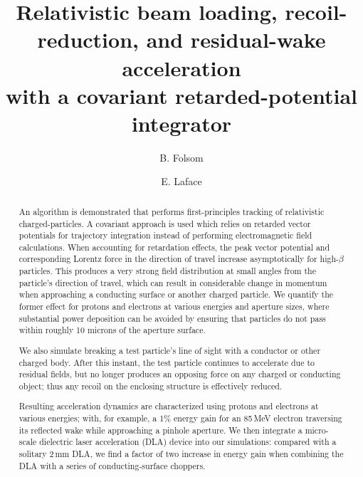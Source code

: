 \documentclass[reprint,
               amsmath,amssymb,nofootinbib, aps%
              ]{revtex4-2}
\begin{document}
\title{
Relativistic beam loading, recoil-reduction, and residual-wake acceleration \\ with a covariant retarded-potential integrator}

\author{B. Folsom}
\author{E. Laface}%
%



\begin{abstract}
An algorithm is demonstrated that performs first-principles tracking of relativistic charged-particles. A covariant approach is used which relies on retarded vector potentials for trajectory integration instead of performing electromagnetic field calculations. When accounting for retardation effects, the peak vector potential and corresponding Lorentz force in the direction of travel increase asymptotically for high-$\beta$ particles. This produces a very strong field distribution at small angles from the particle's direction of travel, which can result in considerable change in momentum when approaching a conducting surface or another charged particle. We quantify the former effect for protons and electrons at various energies and aperture sizes, where substantial power deposition can be avoided by ensuring that particles do not pass within roughly 10 microns of the aperture surface.

We also simulate breaking a test particle's line of sight with a conductor or other charged body. After this instant, the test particle continues to accelerate due to residual fields, but no longer produces an opposing force on any charged or conducting object; thus any recoil on the enclosing structure is effectively reduced. 

Resulting acceleration dynamics are characterized using protons and electrons at various energies; with, for example, a 1\% energy gain for an 85\,MeV electron traversing its reflected wake while approaching a pinhole aperture. We then integrate a micro-scale dielectric laser acceleration (DLA) device into our simulations: compared with a solitary 2\,mm DLA, we find a factor of two increase in energy gain when combining the DLA with a series of conducting-surface choppers.



\end{abstract}
\end{document}
